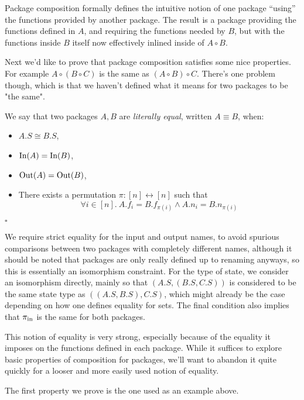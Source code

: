 Package composition formally defines the intuitive notion of one package
``using'' the functions provided by another package.
The result is a package providing the functions defined in $A$,
and requiring the functions needed by $B$, but with the functions
inside $B$ itself now effectively inlined inside of $A \circ B$.

Next we'd like to prove that package composition satisfies some nice
properties.
For example $A \circ (B \circ C)$ is the same as $(A \circ B) \circ C$.
There's one problem though, which is that we haven't defined
what it means for two packages to be "the same".

\begin{definition}
    We say that two packages $A, B$ are \emph{literally equal},
    written $A \equiv B$, when:
    \begin{itemize}
        \item $A.S \cong B.S$,
        \item $\text{In}(A) = \text{In}(B)$,
        \item $\text{Out}(A) = \text{Out}(B)$,
        \item There exists a permutation $\pi : [n] \leftrightarrow [n]$ such that
        $$\forall i \in [n].\ A.f_i = B.f_{\pi(i)} \land A.n_i = B.n_{\pi(i)}$$
    \end{itemize}

    $\square$
\end{definition}

We require strict equality for the input and output names,
to avoid spurious comparisons between two packages with completely different names,
although it should be noted that packages are only really defined up to renaming anyways,
so this is essentially an isomorphism constraint.
For the type of state, we consider an isomorphism directly,
mainly so that $(A.S, (B.S, C.S))$ is considered to be the same state
type as $((A.S, B.S), C.S)$, which might already be the case depending on
how one defines equality for sets.
The final condition also implies that $\pi_{\text{in}}$ is the same
for both packages.

This notion of equality is very strong, especially because of the equality
it imposes on the functions defined in each package.
While it suffices to explore basic properties of composition for packages,
we'll want to abandon it quite quickly for a looser and more easily
used notion of equality.

The first property we prove is the one used as an example above.

